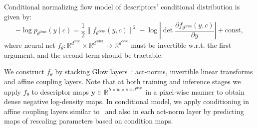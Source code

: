 Conditional normalizing flow model of descriptors' conditional distribution is given by:
\begin{equation}
    -\log p_{\theta^{\text{dens}}}(y \mid c) = \frac{1}{2}\|f_{\theta^{\text{dens}}}(y, c)\|^2 - \log \left| \det \dfrac{\partial f_{\theta^{\text{dens}}}(y, c)}{\partial y} \right| + \text{const},
\end{equation}
where neural net $f_\theta\colon \mathbb{R}^{d^{\text{desc}}} \times \mathbb{R}^{d^{\text{cond}}} \to \mathbb{R}^{d^{\text{desc}}}$ must be invertible w.r.t. the first argument, and the second term should be tractable.

We construct $f_\theta$ by stacking Glow layers~\cite{glow}: act-norms, invertible linear transforms and affine coupling layers. Note that at both training and inference stages we apply $f_\theta$ to descriptor maps $\mathbf{y} \in \mathbb{R}^{h \times w \times s \times d^{\text{desc}}}$ in a pixel-wise manner to obtain dense negative log-density maps. In conditional model, we apply conditioning in affine coupling layers similar to~\cite{cflow} and also in each act-norm layer by predicting maps of rescaling parameters based on condition maps.